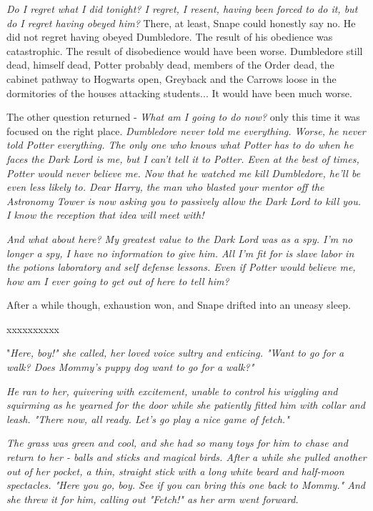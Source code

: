 \documentclass[a4paper,11pt]{article}
\begin{document}
\emph{Do I regret what I did tonight? I regret, I resent, having been forced to do it, but do I regret having obeyed him?} There, at least, Snape could honestly say no. He did not regret having obeyed Dumbledore. The result of his obedience was catastrophic. The result of disobedience would have been worse. Dumbledore still dead, himself dead, Potter probably dead, members of the Order dead, the cabinet pathway to Hogwarts open, Greyback and the Carrows loose in the dormitories of the houses attacking students... It would have been much worse.

The other question returned - \emph{What am I going to do now?} only this time it was focused on the right place. \emph{Dumbledore never told me everything. Worse, he never told Potter everything. The only one who knows what Potter has to do when he faces the Dark Lord is me, but I can't tell it to Potter. Even at the best of times, Potter would never believe me. Now that he watched me kill Dumbledore, he'll be even less likely to. Dear Harry, the man who blasted your mentor off the Astronomy Tower is now asking you to passively allow the Dark Lord to kill you. I know the reception that idea will meet with!}

\emph{And what about here? My greatest value to the Dark Lord was as a spy. I'm no longer a spy, I have no information to give him. All I'm fit for is slave labor in the potions laboratory and self defense lessons. Even if Potter would believe me, how am I ever going to get out of here to tell him?}

After a while though, exhaustion won, and Snape drifted into an uneasy sleep.

xxxxxxxxxx

"\emph{Here, boy!" she called, her loved voice sultry and enticing. "Want to go for a walk? Does Mommy's puppy dog want to go for a walk?"}

\emph{He ran to her, quivering with excitement, unable to control his wiggling and squirming as he yearned for the door while she patiently fitted him with collar and leash. "There now, all ready. Let's go play a nice game of fetch."}

\emph{The grass was green and cool, and she had so many toys for him to chase and return to her - balls and sticks and magical birds. After a while she pulled another out of her pocket, a thin, straight stick with a long white beard and half-moon spectacles. "Here you go, boy. See if you can bring this one back to Mommy." And she threw it for him, calling out "Fetch!" as her arm went forward.}
\end{document}
